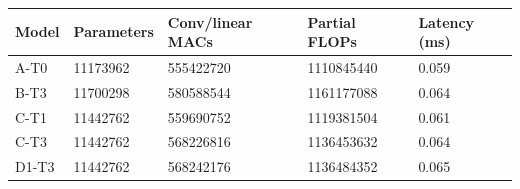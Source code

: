 \begin{tabular}{lllll}
\toprule
Model & Parameters & Conv/linear MACs & Partial FLOPs & Latency (ms) \\
\midrule
A-T0 & 11173962 & 555422720 & 1110845440 & 0.059 \\
B-T3 & 11700298 & 580588544 & 1161177088 & 0.064 \\
C-T1 & 11442762 & 559690752 & 1119381504 & 0.061 \\
C-T3 & 11442762 & 568226816 & 1136453632 & 0.064 \\
D1-T3 & 11442762 & 568242176 & 1136484352 & 0.065 \\
\bottomrule
\end{tabular}

